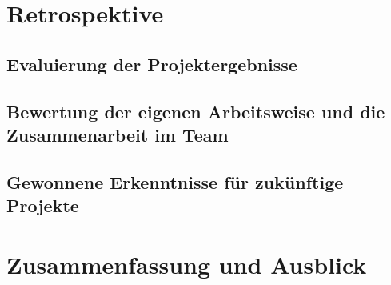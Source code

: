 \documentclass[a4paper,11pt,DIV=12,overfullrule=on]{scrreprt}
\begin{document}
\chapter{Retrospektive}
\section{Evaluierung der Projektergebnisse}
\section{Bewertung der eigenen Arbeitsweise und die Zusammenarbeit im Team}
\section{Gewonnene Erkenntnisse für zukünftige Projekte}

\chapter{Zusammenfassung und Ausblick}

\listoftables
\listoffigures
\end{document}
